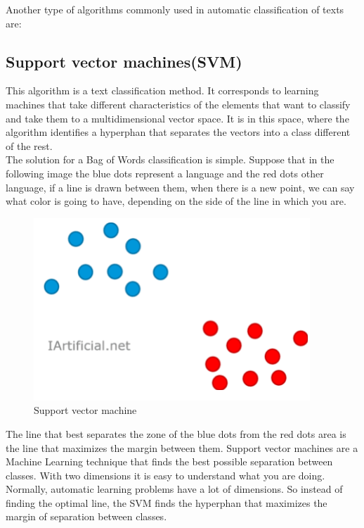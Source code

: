 \documentclass[sigconf,12pt,review=false,natbib=false]{acmart}
\begin{document}
Another type of algorithms commonly used in automatic classification of texts are: \\

\subsection{Support vector machines(SVM)}

This algorithm is a text classification method. It corresponds to learning machines that take different characteristics
of the elements that want to classify and take them to a multidimensional vector space. It is in this space, where the
algorithm identifies a hyperphan that separates the vectors into a class different of the rest. \\

The solution for a Bag of Words classification is simple. Suppose that in the following image the blue dots represent
a language and the red dots other language, if a line is drawn between them, when there is a new point, we can say what
color is going to have, depending on the side of the line in which you are. \\

\begin{figure}[h!]
    \centering
    \includegraphics[]{svm}
    \caption{Support vector machine}
    \label{fig:svm}
\end{figure}

The line that best separates the zone of the blue dots from the red dots area is the line that maximizes the margin
between them. Support vector machines are a Machine Learning technique that finds the best possible separation between
classes. With two dimensions it is easy to understand what you are doing. Normally, automatic learning problems have a
lot of dimensions. So instead of finding the optimal line, the SVM finds the hyperphan that maximizes the margin of
separation between classes. \\
\end{document}

